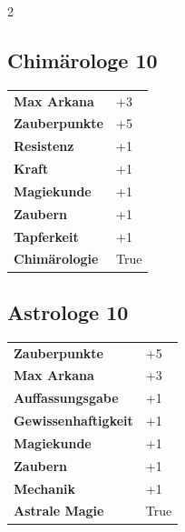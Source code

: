 \begin{multicols}{2}
\begin{tcolorbox}

\end{tcolorbox}

\begin{tcolorbox}
    \subsection*{Chimärologe \hfill \small{10 }}
    \tcblower




\begin{tabular}{@{}ll@{}}
    \textbf{Max Arkana} & +3\\
    \textbf{Zauberpunkte} & +5\\
    \textbf{Resistenz} & +1\\
    \textbf{Kraft} & +1\\
    \textbf{Magiekunde} & +1\\
    \textbf{Zaubern} & +1\\
    \textbf{Tapferkeit} & +1\\
    \textbf{Chimärologie} & True\\
\end{tabular}


\end{tcolorbox}

\begin{tcolorbox}
    \subsection*{Astrologe \hfill \small{10 }}
    \tcblower




\begin{tabular}{@{}ll@{}}
    \textbf{Zauberpunkte} & +5\\
    \textbf{Max Arkana} & +3\\
    \textbf{Auffassungsgabe} & +1\\
    \textbf{Gewissenhaftigkeit} & +1\\
    \textbf{Magiekunde} & +1\\
    \textbf{Zaubern} & +1\\
    \textbf{Mechanik} & +1\\
    \textbf{Astrale Magie} & True\\
\end{tabular}


\end{tcolorbox}
\end{multicols}
